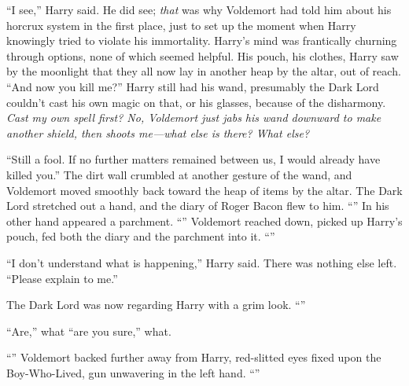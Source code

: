 “I see,” Harry said. He did see; \emph{that} was why Voldemort had told him about his horcrux system in the first place, just to set up the moment when Harry knowingly tried to violate his immortality. Harry’s mind was frantically churning through options, none of which seemed helpful. His pouch, his clothes, Harry saw by the moonlight that they all now lay in another heap by the altar, out of reach.
“And now you kill me?” Harry still had his wand, presumably the Dark Lord couldn’t cast his own magic on that, or his glasses, because of the disharmony. \emph{Cast my own spell first? No, Voldemort just jabs his wand downward to make another shield, then shoots me—what else is there? \emph{What else?}}

“Still a fool. If no further matters remained between us, I would already have killed you.” The dirt wall crumbled at another gesture of the wand, and Voldemort moved smoothly back toward the heap of items by the altar. The Dark Lord stretched out a hand, and the diary of Roger Bacon flew to him. “” In his other hand appeared a parchment. “” Voldemort reached down, picked up Harry’s pouch, fed both the diary and the parchment into it. “”

“I don’t understand what is happening,” Harry said. There was nothing else left.
“Please explain to me.”

The Dark Lord was now regarding Harry with a grim look. “”

“Are,” what “are you sure,” what.

“” Voldemort backed further away from Harry, red-slitted eyes fixed upon the Boy-Who-Lived, gun unwavering in the left hand. “”

